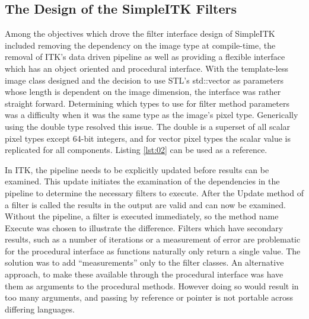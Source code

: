 \documentclass{frontiersMED} %
\begin{document}
\subsection{The Design of the SimpleITK Filters}
Among the objectives which drove the filter interface design of
SimpleITK included removing the dependency on the image type at
compile-time, the removal of ITK's data driven pipeline as well as
providing a flexible interface which has an object oriented and
procedural interface. With the template-less image class designed and
the decision to use STL's std::vector as parameters whose length is
dependent on the image dimension, the interface was rather straight
forward. Determining which types to use for filter method parameters
was a difficulty when it was the same type as the image's pixel
type. Generically using the double type resolved this issue. The
double is a superset of all scalar pixel types except 64-bit integers,
and for vector pixel types the scalar value is replicated for all
components. Listing \ref{lst:02} can be used as a reference.



In ITK, the pipeline needs to be explicitly updated before results can
be examined. This update initiates the examination of the dependencies
in the pipeline to determine the necessary filters to execute. After
the Update method of a filter is called the results in the output are
valid and can now be examined. Without the pipeline, a filter is
executed immediately, so the method name Execute was chosen to
illustrate the difference. Filters which have secondary results, such
as a number of iterations or a measurement of error are problematic
for the procedural interface as functions naturally only return a
single value. The solution was to add “measurements” only to the
filter classes. An alternative approach, to make these available
through the procedural interface was  have them as arguments to the
procedural methods. However doing so would result in too many
arguments, and passing by reference or pointer is not portable across
differing languages.
\end{document}
